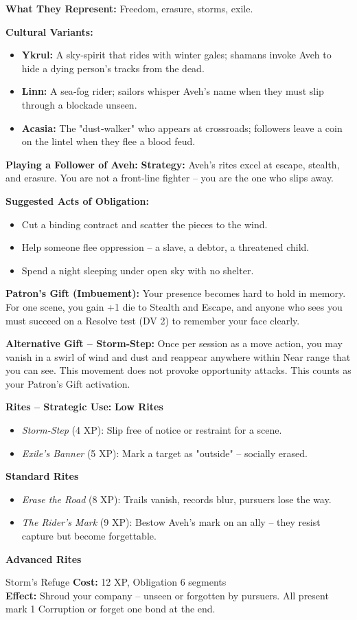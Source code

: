 \documentclass[10pt,a5paper]{book}
\begin{document}
\textbf{What They Represent:} Freedom, erasure, storms, exile.

\textbf{Cultural Variants:}
\begin{itemize}
    \item \textbf{Ykrul:} A sky‑spirit that rides with winter gales; shamans invoke Aveh to hide a dying person's tracks from the dead.
    \item \textbf{Linn:} A sea‑fog rider; sailors whisper Aveh's name when they must slip through a blockade unseen.
    \item \textbf{Acasia:} The "dust‑walker" who appears at crossroads; followers leave a coin on the lintel when they flee a blood feud.
\end{itemize}

\textbf{Playing a Follower of Aveh:}
\textbf{Strategy:} Aveh's rites excel at escape, stealth, and erasure. You are not a front‑line fighter -- you are the one who slips away.

\textbf{Suggested Acts of Obligation:}
\begin{itemize}
    \item Cut a binding contract and scatter the pieces to the wind.
    \item Help someone flee oppression -- a slave, a debtor, a threatened child.
    \item Spend a night sleeping under open sky with no shelter.
\end{itemize}

\textbf{Patron's Gift (Imbuement):} Your presence becomes hard to hold in memory. For one scene, you gain +1 die to Stealth and Escape, and anyone who sees you must succeed on a Resolve test (DV 2) to remember your face clearly.

\textbf{Alternative Gift -- Storm‑Step:} Once per session as a move action, you may vanish in a swirl of wind and dust and reappear anywhere within Near range that you can see. This movement does not provoke opportunity attacks. This counts as your Patron's Gift activation.

\textbf{Rites -- Strategic Use:}
\textbf{Low Rites}
\begin{itemize}
    \item \textit{Storm-Step} (4 XP): Slip free of notice or restraint for a scene.
    \item \textit{Exile's Banner} (5 XP): Mark a target as "outside" -- socially erased.
\end{itemize}
\textbf{Standard Rites}
\begin{itemize}
    \item \textit{Erase the Road} (8 XP): Trails vanish, records blur, pursuers lose the way.
    \item \textit{The Rider's Mark} (9 XP): Bestow Aveh's mark on an ally -- they resist capture but become forgettable.
\end{itemize}
\textbf{Advanced Rites}
\begin{patronbox}{Storm's Refuge}
\textbf{Cost:} 12 XP, Obligation 6 segments \\
\textbf{Effect:} Shroud your company -- unseen or forgotten by pursuers. All present mark 1 Corruption or forget one bond at the end.
\end{patronbox}
\end{document}

